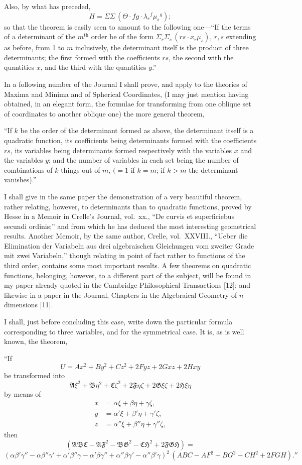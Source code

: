 \documentclass[11pt]{article}
\newcommand{\fA}{\mathfrak{A}}
\newcommand{\fB}{\mathfrak{B}}
\newcommand{\fC}{\mathfrak{C}}
\newcommand{\fF}{\mathfrak{F}}
\newcommand{\fG}{\mathfrak{G}}
\newcommand{\fH}{\mathfrak{H}}
\begin{document}
Also, by what has preceded,
\[
H = \Sigma\Sigma\,(\Theta\cdot fg \cdot \lambda_r{}^f \mu_s{}^g);
\]
so that the theorem is easily seen to amount to the following one---``If the terms of
a determinant of the $m^{\text{th}}$ order be of the form $\Sigma_r \Sigma_s\,(rs \cdot x_r \mu_s)$, $r, s$ extending as
before, from 1 to $m$ inclusively, the determinant itself is the product of three determinants;
the first formed with the coefficients $rs$, the second with the quantities $x$,
and the third with the quantities $y$.''

In a following number of the Journal I shall prove, and apply to the theories of
Maxima and Minima and of Spherical Coordinates, (I may just mention having obtained,
in an elegant form, the formulae for transforming from one oblique set of coordinates
to another oblique one) the more general theorem,

``If $k$ be the order of the determinant formed as above, the determinant itself
is a quadratic function, its coefficients being determinants formed with the coefficients
$rs$, its variables being determinants formed respectively with the variables $x$ and the
variables $y$; and the number of variables in each set being the number of combinations
of $k$ things out of $m$, $(=1$ if $k=m$; if $k > m$ the determinant vanishes).''

I shall give in the same paper the demonstration of a very beautiful theorem,
rather relating, however, to determinants than to quadratic functions, proved by Hesse
in a Memoir in Crelle's Journal, vol.~xx., ``De curvis et superficiebus secundi ordinis;''
and from which he has deduced the most interesting geometrical results. Another
Memoir, by the same author, Crelle, vol.~XXVIII., ``Ueber die Elimination der Variabeln
aus drei algebraischen Gleichungen vom zweiter Grade mit zwei Variabeln,'' though
relating in point of fact rather to functions of the third order, contains some most
important results. A few theorems on quadratic functions, belonging, however, to a
different part of the subject, will be found in my paper already quoted in the Cambridge
Philosophical Transactions [12]; and likewise in a paper in the Journal, Chapters in
the Algebraical Geometry of $n$ dimensions [11].

I shall, just before concluding this case, write down the particular formula corresponding
to three variables, and for the symmetrical case. It is, as is well known, the
theorem,

``If
\[
U = Ax^2 + By^2 + Cz^2 + 2Fyz + 2Gxz + 2Hxy
\]
be transformed into
\[
\fA \xi^2 + \fB \eta^2 + \fC \zeta^2 + 2\fF \eta\zeta + 2\fG \xi\zeta + 2\fH \xi\eta
\]
by means of
\[
\begin{aligned}
x &= \alpha\xi + \beta\eta + \gamma\zeta,\\
y &= \alpha'\xi + \beta'\eta + \gamma'\zeta,\\
z &= \alpha''\xi + \beta''\eta + \gamma''\zeta,
\end{aligned}
\]
then
\[
(\fA\fB\fC - \fA\fF^2 - \fB\fG^2 - \fC\fH^2 + 2\fF\fG\fH) =
\]
\[
(\alpha\beta'\gamma'' - \alpha\beta''\gamma' + \alpha'\beta''\gamma - \alpha'\beta\gamma'' + \alpha''\beta\gamma' - \alpha''\beta'\gamma)^2\,(ABC - AF^2 - BG^2 - CH^2 + 2FGH).''
\]
\end{document}
